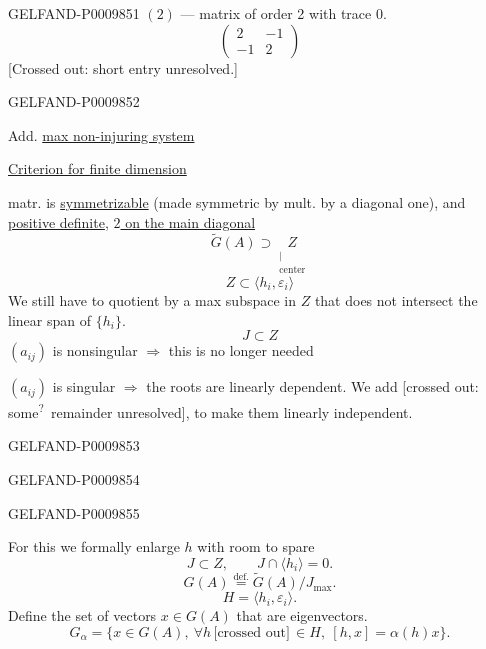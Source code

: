 \begin{GelfandAdjacentEvidence}{GELFAND-P000985}{1}
$(2)$ --- matrix of order 2 with trace $0$.
\[
\begin{pmatrix}2&-1\\-1&2\end{pmatrix}
\]
[Crossed out: short entry unresolved.]
\end{GelfandAdjacentEvidence}
\begin{GelfandAdjacentEvidence}{GELFAND-P000985}{2}


Add. \underline{max non-injuring system}

\underline{Criterion for finite dimension}

matr. is \underline{symmetrizable} (made symmetric by mult. by a diagonal one), and \underline{positive definite}, \underline{$2$ on the main diagonal}
\[
\widetilde G(A)\supset\underset{\substack{\vert\\\text{center}}}{Z}
\]
\[
Z\subset\langle h_i,\varepsilon_i\rangle
\]
We still have to quotient by a max subspace in $Z$ that does not intersect the linear span of $\{h_i\}$.
\[
J\subset Z
\]
$(a_{ij})$ is nonsingular $\Rightarrow$ this is no longer needed

$(a_{ij})$ is singular $\Rightarrow$ the roots are linearly dependent.
We add [crossed out: some\textsuperscript{?}\ remainder unresolved], to make them linearly independent.
\end{GelfandAdjacentEvidence}
\begin{GelfandAdjacentEvidence}{GELFAND-P000985}{3}

\end{GelfandAdjacentEvidence}
\begin{GelfandAdjacentEvidence}{GELFAND-P000985}{4}

\end{GelfandAdjacentEvidence}
\begin{GelfandAdjacentEvidence}{GELFAND-P000985}{5}


For this we formally enlarge $h$ with room to spare
\[
J\subset Z,\qquad J\cap\langle h_i\rangle=0.
\]
\[
G(A)\overset{\text{def.}}{=}\widetilde G(A)/J_{\max}.
\]
\[
H=\langle h_i,\varepsilon_i\rangle.
\]
Define the set of vectors $x\in G(A)$ that are eigenvectors.
\[
G_\alpha=\{x\in G(A),\ \forall h\,\text{[crossed out]}\,\in H,\ [h,x]=\alpha(h)x\}.
\]
\end{GelfandAdjacentEvidence}
